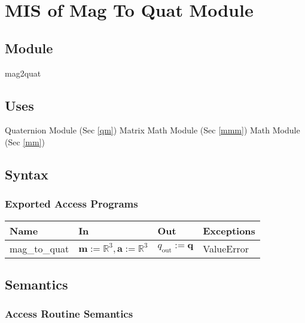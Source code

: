 \documentclass[12pt, titlepage]{article}
\begin{document}
\newpage

\section{MIS of Mag To Quat Module} \label{iqewmm}

\subsection{Module}
mag2quat

\subsection{Uses}
Quaternion Module (Sec \ref{qm})\newline
Matrix Math Module (Sec \ref{mmm}) \newline
Math Module (Sec \ref{mm})

\subsection{Syntax}

\subsubsection{Exported Access Programs}

\begin{center}
\begin{tabular}{p{3cm} p{4cm} p{3cm} p{2cm}}
\hline
\textbf{Name} & \textbf{In} & \textbf{Out} & \textbf{Exceptions} \\
\hline
mag\_to\_quat & $\mathbf{m}:=\mathbb{R}^3, \mathbf{a}:=\mathbb{R}^3$ & $q_\text{out} := \mathbf{q}$ & ValueError \\
\hline
\end{tabular}
\end{center}

\subsection{Semantics}

\subsubsection{Access Routine Semantics}
\end{document}
